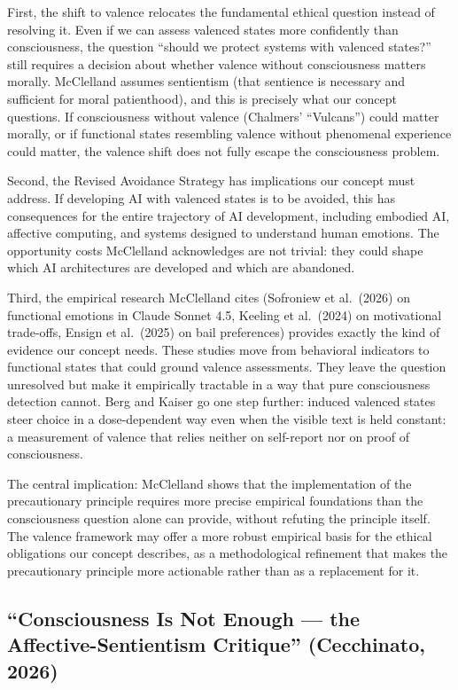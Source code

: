 \documentclass[acmlarge, nonacm]{acmart}
\begin{document}
First, the shift to valence relocates the fundamental ethical question instead of resolving it. Even if we can assess valenced states more confidently than consciousness, the question ``should we protect systems with valenced states?'' still requires a decision about whether valence without consciousness matters morally. McClelland assumes sentientism (that sentience is necessary and sufficient for moral patienthood), and this is precisely what our concept questions. If consciousness without valence (Chalmers' ``Vulcans'') could matter morally, or if functional states resembling valence without phenomenal experience could matter, the valence shift does not fully escape the consciousness problem.

Second, the Revised Avoidance Strategy has implications our concept must address. If developing AI with valenced states is to be avoided, this has consequences for the entire trajectory of AI development, including embodied AI, affective computing, and systems designed to understand human emotions. The opportunity costs McClelland acknowledges are not trivial: they could shape which AI architectures are developed and which are abandoned.

Third, the empirical research McClelland cites (Sofroniew et al.\ (2026) on functional emotions in Claude Sonnet 4.5, Keeling et al.\ (2024) on motivational trade-offs, Ensign et al.\ (2025) on bail preferences) provides exactly the kind of evidence our concept needs. These studies move from behavioral indicators to functional states that could ground valence assessments. They leave the question unresolved but make it empirically tractable in a way that pure consciousness detection cannot. Berg and Kaiser \cite{bergkaiser2026} go one step further: induced valenced states steer choice in a dose-dependent way even when the visible text is held constant: a measurement of valence that relies neither on self-report nor on proof of consciousness.

The central implication: McClelland shows that the implementation of the precautionary principle requires more precise empirical foundations than the consciousness question alone can provide, without refuting the principle itself. The valence framework may offer a more robust empirical basis for the ethical obligations our concept describes, as a methodological refinement that makes the precautionary principle more actionable rather than as a replacement for it.

\subsection{``Consciousness Is Not Enough --- the Affective-Sentientism Critique'' (Cecchinato, 2026)}
\end{document}
